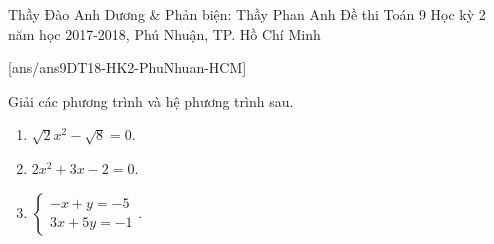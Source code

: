 \begin{name}
{Thầy Đào Anh Dương \& Phản biện: Thầy Phan Anh}
{Đề thi Toán 9 Học kỳ 2 năm học 2017-2018, Phú Nhuận, TP. Hồ Chí Minh }
\end{name}
\setcounter{ex}{0}
[ans/ans9DT18-HK2-PhuNhuan-HCM]
\begin{ex}%
	Giải các phương trình và hệ phương trình sau.
	\begin{enumerate}
		\item $\sqrt{2}x^2-\sqrt{8}=0$.
		\item $2x^2+3x-2=0$.
		\item $\begin{cases} -x+y=-5\\ 3x+5y=-1 \end{cases}$.
	\end{enumerate}
\end{ex}

